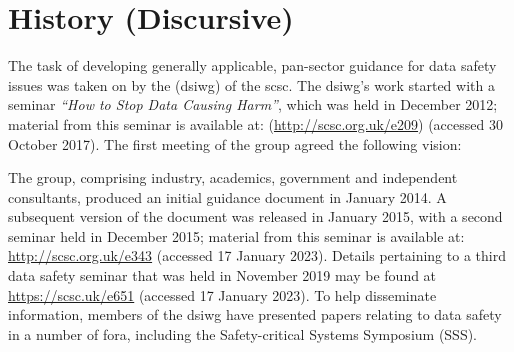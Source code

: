 %
%
\section{ History (Discursive)} \label{bkm:history}


The task of developing generally applicable, pan-sector guidance for data safety issues was taken on by the (\gls{dsiwg}) of the \gls{scsc}. The \gls{dsiwg}'s work started with a seminar \textit{``How to Stop Data Causing Harm''}, which was held in December 2012; material from this seminar is available at: (\href{http://scsc.org.uk/e209}{http://scsc.org.uk/e209}) (accessed 30 October 2017). The first meeting of the group agreed the following vision: 

\begin{quote}
\end{quote}

The group, comprising industry, academics, government and independent consultants,
produced an initial guidance document in January 2014.
A subsequent version of the document was released in January 2015,
with a second seminar  held in December 2015;
material from this seminar is available at: \href{http://scsc.org.uk/e343}{http://scsc.org.uk/e343} (accessed 17 January 2023).
Details pertaining to a third data safety seminar  that was held in November 2019 may be found at
\href{https://scsc.uk/e651}{https://scsc.uk/e651}
(accessed 17 January 2023).
To help disseminate information, members of the \gls{dsiwg} have presented papers relating to data safety in a number of fora,
including the Safety-critical Systems Symposium (SSS).

